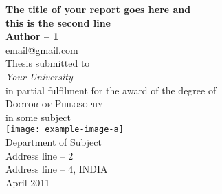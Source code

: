 \begin{titlepage}
\begin{center}
 {\huge\bfseries The title of your report goes here and \\ this is the second line\\}
 \vspace{1.5cm}
 {\Large\bfseries Author -- 1}\\[5pt]
 email@gmail.com\\[14pt]
 \vspace{2cm}
{Thesis  submitted to} \\[5pt]
\emph{{Your University}}\\[2cm]
{in partial fulfilment for the award of the degree
 of} \\[2cm]
\textsc{\Large{{Doctor of Philosophy}}} \\[5pt]
{in some subject} \vspace{0.4cm} \\[2cm]
 \vfill
\texttt{[image: example-image-a]}\\[5pt]
{Department of Subject}\\[5pt]
{Address line -- 2}\\[5pt]
{Address line -- 4,
 INDIA}\\
 \vfill
{April 2011}
\end{center}
\end{titlepage}